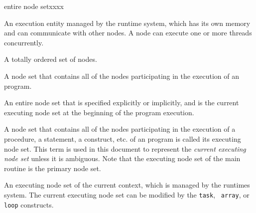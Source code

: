 \begin{namelist}{entire node setxxxx}

%



 An execution entity managed by the {\XMP} runtime system, which has its
 own memory and can communicate with other nodes. A node can execute one
 or more threads concurrently.

%


 A totally ordered set of nodes.


 A node set that contains all of the nodes participating in the
 execution of an {\XMP} program.


 An entire node set that is specified explicitly or implicitly, and is
 the current executing node set at the beginning of the program
 execution.


 A node set that contains all of the nodes participating in the
 execution of a procedure, a statement, a construct, etc. of an
 {\XMP} program is called its executing node set.
%
 This term is used in this document to represent the {\it current
 executing node set} unless it is ambiguous.
%
 Note that the executing node set of the main routine is the
 primary node set.


 An executing node set of the current context, which is managed by the
 {\XMP} runtimes system.
%
 The current executing node set can be modified by the {\tt task}, {\tt
 array}, or {\tt loop} constructs. 


\end{namelist}
